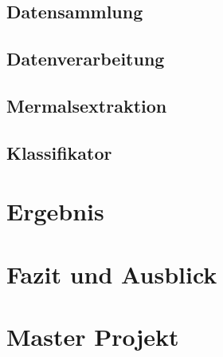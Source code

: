 \section{Datensammlung}


\section{Datenverarbeitung}


\section{Mermalsextraktion}


\section{Klassifikator}



\chapter{Ergebnis}


\chapter{Fazit und Ausblick}


\chapter{Master Projekt}


\cleardoublepage 


\cleardoublepage


